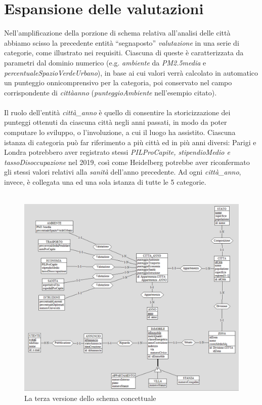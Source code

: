 \documentclass[a4paper,12pt]{report}
\begin{document}
        \section{Espansione delle valutazioni}
        Nell’amplificazione della porzione di schema relativa all’analisi delle città abbiamo scisso la precedente entità 
        “segnaposto” \textit{valutazione} in una serie di categorie, come illustrato nei requisiti. Ciascuna di queste è caratterizzata 
        da parametri dal dominio numerico (e.g. \textit{ambiente} da \textit{PM2.5media} e \textit{percentualeSpazioVerdeUrbano}), in
        base ai cui valori verrà calcolato in automatico un punteggio onnicomprensivo per la categoria, poi conservato nel campo 
        corrispondente di \textit{città\textunderscore anno} (\textit{punteggioAmbiente} nell’esempio citato). \\
        \\
        Il ruolo dell’entità \textit{città\_anno} è quello di consentire la storicizzazione dei punteggi ottenuti da ciascuna città 
        negli anni passati, in modo da poter computare lo sviluppo, o l’involuzione, a cui il luogo ha assistito. Ciascuna istanza 
        di categoria può far riferimento a più città ed in più anni diversi: Parigi e Londra potrebbero aver registrato stessi 
        \textit{PILProCapite, stipendioMedio e tassoDisoccupazione} nel 2019, così come Heidelberg potrebbe aver riconfermato gli 
        stessi valori relativi alla \textit{sanità} dell'anno precedente. Ad ogni \textit{città\_anno}, invece, è collegata una ed 
        una sola istanza di tutte le 5 categorie. \\
        \\
        
        \begin{figure}[ht]
            \centering{}
            \includegraphics[width=\linewidth]{./images/third.png}
            \caption{La terza versione dello schema concettuale}
        \end{figure}
        	
\end{document}
